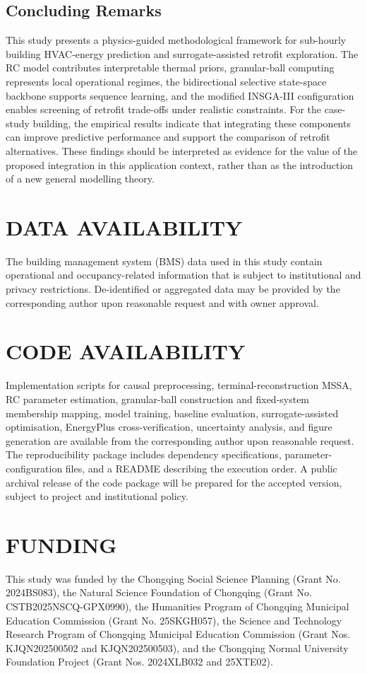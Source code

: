 \documentclass[11pt]{article}
\begin{document}
\subsection{Concluding Remarks}
This study presents a physics-guided methodological framework for sub-hourly building HVAC-energy prediction and surrogate-assisted retrofit exploration. The RC model contributes interpretable thermal priors, granular-ball computing represents local operational regimes, the bidirectional selective state-space backbone supports sequence learning, and the modified INSGA-III configuration enables screening of retrofit trade-offs under realistic constraints. For the case-study building, the empirical results indicate that integrating these components can improve predictive performance and support the comparison of retrofit alternatives. These findings should be interpreted as evidence for the value of the proposed integration in this application context, rather than as the introduction of a new general modelling theory.

\section*{DATA AVAILABILITY}
The building management system (BMS) data used in this study contain operational and occupancy-related information that is subject to institutional and privacy restrictions. De-identified or aggregated data may be provided by the corresponding author upon reasonable request and with owner approval.

\section*{CODE AVAILABILITY}
Implementation scripts for causal preprocessing, terminal-reconstruction MSSA, RC parameter estimation, granular-ball construction and fixed-system membership mapping, model training, baseline evaluation, surrogate-assisted optimisation, EnergyPlus cross-verification, uncertainty analysis, and figure generation are available from the corresponding author upon reasonable request. The reproducibility package includes dependency specifications, parameter-configuration files, and a README describing the execution order. A public archival release of the code package will be prepared for the accepted version, subject to project and institutional policy.

\section*{FUNDING}
This study was funded by the Chongqing Social Science Planning (Grant No. 2024BS083), the Natural Science Foundation of Chongqing (Grant No. CSTB2025NSCQ-GPX0990), the Humanities Program of Chongqing Municipal Education Commission (Grant No. 25SKGH057), the Science and Technology Research Program of Chongqing Municipal Education Commission (Grant Nos. KJQN202500502 and KJQN202500503), and the Chongqing Normal University Foundation Project (Grant Nos. 2024XLB032 and 25XTE02).
\end{document}
